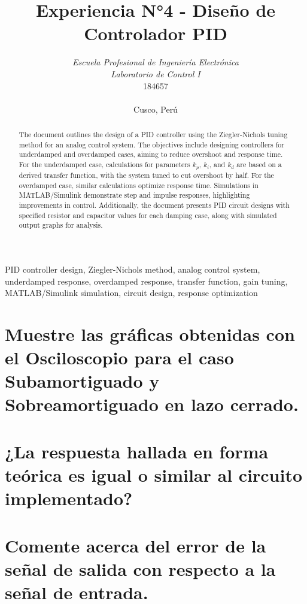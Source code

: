 \documentclass[conference]{IEEEtran}
\begin{document}
	
	\title{Experiencia N°4 - Diseño de Controlador PID}
	\author{	
		\textit{Escuela Profesional de Ingeniería Electrónica}\\
		\textit{Laboratorio de Control I}\\
		184657 \\\\
		Cusco, Perú
	}
	
	\maketitle
	
	\begin{abstract}
		The document outlines the design of a PID controller using the Ziegler-Nichols tuning method for an analog control system. The objectives include designing controllers for underdamped and overdamped cases, aiming to reduce overshoot and response time. For the underdamped case, calculations for parameters \( k_p \), \( k_i \), and \( k_d \) are based on a derived transfer function, with the system tuned to cut overshoot by half. For the overdamped case, similar calculations optimize response time. Simulations in MATLAB/Simulink demonstrate step and impulse responses, highlighting improvements in control. Additionally, the document presents PID circuit designs with specified resistor and capacitor values for each damping case, along with simulated output graphs for analysis.
	\end{abstract}
	
	\begin{IEEEkeywords}
		PID controller design, Ziegler-Nichols method, analog control system, underdamped response, overdamped response, transfer function, gain tuning, MATLAB/Simulink simulation, circuit design, response optimization
	\end{IEEEkeywords}
	
	\section{Muestre las gráficas obtenidas con el Osciloscopio para el caso Subamortiguado y
		Sobreamortiguado en lazo cerrado.}
		
	\section{¿La respuesta hallada en forma teórica es igual o similar al circuito implementado?}
	
	\section{Comente acerca del error de la señal de salida con respecto a la señal de entrada.}
	
	
	
\end{document}

